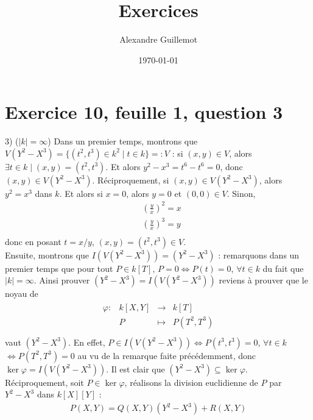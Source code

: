 \documentclass[11pt]{article}
\begin{document}
\title{Exercices}
\date{\today}
\author{Alexandre Guillemot}
\maketitle

\section*{Exercice 10, feuille 1, question 3}
    \begin{question}{3)} ($|k| = \infty$)
        Dans un premier temps, montrons que $V(Y^2 - X^3) = \{(t^2, t^3) \in k^2 \mid t \in k\} =: V$ : si $(x,y) \in V$, alors $\exists t \in k \mid (x,y) = (t^2, t^3)$. Et alors $y^2 - x^3 = t^6 - t^6 = 0$, donc $(x,y) \in V(Y^2 - X^3)$. Réciproquement, si $(x,y) \in V(Y^2 - X^3)$, alors $y^2 = x^3$ dans $k$. Et alors si $x = 0$, alors $y = 0$ et $(0,0) \in V$. Sinon,
        \begin{align*}
            &\left(\frac{y}{x}\right)^2 = x \\
            &\left(\frac{y}{x}\right)^3 = y \\
        \end{align*}
        donc en posant $t = x/y$, $(x,y) = (t^2, t^3) \in V$. \\
        Ensuite, montrons que $I(V(Y^2 - X^3)) = (Y^2 - X^3)$ : remarquons dans un premier temps que pour tout $P \in k[T]$, $P = 0 \iff P(t) = 0$, $\forall t \in k$ du fait que $|k| = \infty$. Ainsi prouver $(Y^2 - X^3) = I(V(Y^2 - X^3))$ reviens à prouver que le noyau de
        \begin{align*}
            \begin{array}{cccc}
                \varphi : & k[X,Y] & \to & k[T] \\
                & P & \mapsto & P(T^2,T^3) \\
            \end{array}
        \end{align*}
        vaut $(Y^2 - X^3)$. En effet, $P \in I(V(Y^2 - X^3)) \iff P(t^3, t^3) = 0$, $\forall t \in k$ $\iff P(T^2, T^3) = 0$ au vu de la remarque faite précédemment, donc $\ker \varphi = I(V(Y^2 - X^3))$. Il est clair que $(Y^2 - X^3) \subseteq \ker \varphi$. Réciproquement, soit $P \in \ker \varphi$, réalisons la division euclidienne de $P$ par $Y^2 - X^3$ dans $k[X][Y]$ :
        \begin{align*}
            P(X,Y) = Q(X,Y)(Y^2 - X^3) + R(X,Y)
        \end{align*}

\end{question}
\end{document}
